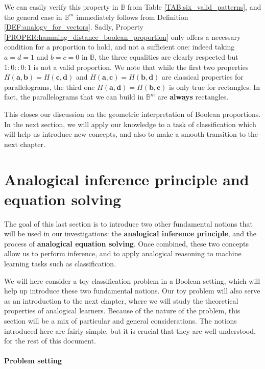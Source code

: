 We can easily verify this property in $\mathbb{B}$ from Table
\ref{TAB:six_valid_patterns}, and the general case in $\mathbb{B}^m$ immediately
follows from Definition \ref{DEF:analogy_for_vectors}. Sadly, Property
\ref{PROPER:hamming_distance_boolean_proportion} only offers a necessary
condition for a proportion to hold, and not a sufficient one: indeed taking $a
= d = 1$ and $b = c =0$ in $\mathbb{B}$, the three equalities are clearly
respected but $1:0::0:1$ is not a valid proportion. We note that
while the first two properties $H(\mathbf{a}, \mathbf{b}) = H(\mathbf{c},
\mathbf{d})$ and $H(\mathbf{a}, \mathbf{c}) = H(\mathbf{b}, \mathbf{d})$ are
classical properties for parallelograms, the third one $H(\mathbf{a},
\mathbf{d}) = H(\mathbf{b}, \mathbf{c})$ is only true for rectangles. In fact,
the parallelograms that we can build in $\mathbb{B}^m$ are \textbf{always}
rectangles.

This closes our discussion on the geometric interpretation of Boolean
proportions. In the next section, we will apply our knowledge to a task of
classification which will help us introduce new concepts, and also to make a
smooth transition to the next chapter.

\section{Analogical inference principle and equation solving}
\label{SEC:machine_learning_with_boolean_proportions}

The goal of this last section is to introduce two other fundamental notions
that will be used in our investigations: the \textbf{analogical inference
principle}, and the process of \textbf{analogical equation solving}. Once
combined, these two concepts allow us to perform inference, and to apply
analogical reasoning to machine learning tasks such as classification.

We will here consider a toy classification problem in a Boolean
setting, which will help up introduce these two fundamental notions. Our toy
problem will also serve as an introduction to the next chapter, where we will
study the theoretical properties of analogical learners. Because of the nature
of the problem, this section will be a mix of particular and general
considerations. The notions introduced here are fairly simple, but it is crucial
that they are well understood, for the rest of this document.

\paragraph{Problem setting\\}

